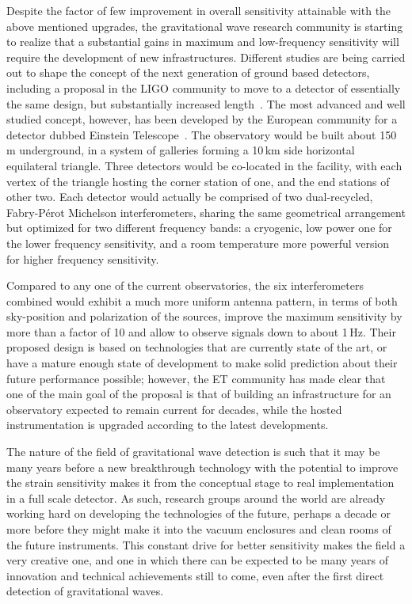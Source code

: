 Despite the factor of few improvement in overall sensitivity attainable with the above mentioned upgrades, the gravitational wave research community is starting to realize that a substantial gains in maximum and low-frequency sensitivity will require the development of new infrastructures. 
Different studies are being carried out to shape the concept of the next generation of ground based detectors, including a proposal in the LIGO community to move to a detector of essentially the same design, but substantially increased length~\cite{Dwyer2015}.
The most advanced and well studied concept, however, has been developed by the European community for a detector dubbed Einstein Telescope~\cite{Punturo2010}.
The observatory would be built about 150\,m underground, in a system of galleries forming a 10\,km side horizontal equilateral triangle. Three detectors would be co-located in the facility, with each vertex of the triangle hosting the corner station of one, and the end stations of other two.
Each detector would actually be comprised of two dual-recycled, Fabry-P\'{e}rot Michelson  interferometers, sharing the same geometrical arrangement but optimized for two different frequency bands: a cryogenic, low power one for the lower frequency sensitivity, and a room temperature more powerful version for higher frequency sensitivity.

Compared to any one of the current observatories, the six interferometers combined would exhibit a much more uniform antenna pattern, in terms of both sky-position and polarization of the sources, improve the maximum sensitivity by more than a factor of 10 and allow to observe signals down to about 1\,Hz. 
Their proposed design is based on technologies that are currently state of the art, or have a mature enough state of development to make solid prediction about their future performance possible; however, the ET community has made clear that one of the main goal of the proposal is that of building an infrastructure for an observatory expected to remain current for decades, while the hosted instrumentation is upgraded according to the latest developments.

The nature of the field of gravitational wave detection is such that it may be many years before a new breakthrough technology with the potential to improve the strain sensitivity makes it from the conceptual stage to real implementation in a full scale detector. 
As such, research groups around the world are already working hard on developing the technologies of the future, perhaps a decade or more before they might make it into the vacuum enclosures and clean rooms of the future instruments. 
This constant drive for better sensitivity makes the field a very creative one, and one in which there can be expected to be many years of innovation and technical achievements still to come, even after the first direct detection of gravitational waves.